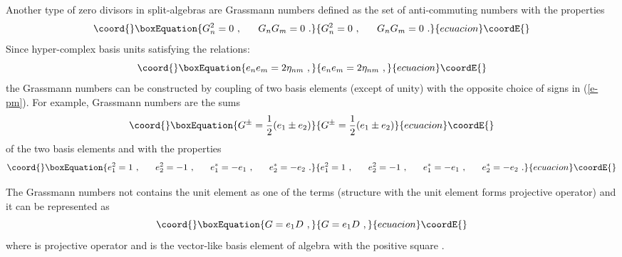 \documentclass[a4paper,12pt]{article}
\begin{document}
Another type of zero divisors in split-algebras are Grassmann numbers defined as the set of 
anti-commuting numbers \coordHE{} with the properties 
\begin{equation}\coord{}\boxEquation{ \label{G}
G^2_n = 0~, ~~~~~{G_n G_m} = 0~. 
}{ G^2_n = 0~, ~~~~~{G_n G_m} = 0~. 
}{ecuacion}\coordE{}\end{equation}
Since hyper-complex basis units satisfying the relations:
\begin{equation}\coord{}\boxEquation{ \label{ee=eta}
e_n e_m = 2\eta_{nm}~, 
}{ e_n e_m = 2\eta_{nm}~, 
}{ecuacion}\coordE{}\end{equation}
the Grassmann numbers can be constructed by coupling of two basis elements (except of unity) 
with the opposite choice of signs in (\ref{e-pm}). For example, Grassmann numbers are the 
sums 
\begin{equation}\coord{}\boxEquation{ \label{G-pm}
G^\pm = \frac{1}{2}(e_1 \pm e_2)
}{ G^\pm = \frac{1}{2}(e_1 \pm e_2)
}{ecuacion}\coordE{}\end{equation}
of the two basis elements \coordHE{} and \coordHE{} with the properties
\begin{equation}\coord{}\boxEquation{ \label{e12}
e_1^2 = 1 ~, ~~~~~ e_2^2 = -1 ~, ~~~~~ e_1^* = - e_1 ~, ~~~~~ e_2^* = - e_2~.
}{ e_1^2 = 1 ~, ~~~~~ e_2^2 = -1 ~, ~~~~~ e_1^* = - e_1 ~, ~~~~~ e_2^* = - e_2~.
}{ecuacion}\coordE{}\end{equation}

The Grassmann numbers not contains the unit element \coordHE{} as one of the terms (structure with 
the unit element forms projective operator) and it can be represented as
\begin{equation}\coord{}\boxEquation{ \label{G=D}
G = e_1 D ~,
}{ G = e_1 D ~,
}{ecuacion}\coordE{}\end{equation}
where \coordHE{} is projective operator and \coordHE{} is the vector-like basis element of algebra with 
the positive square \coordHE{}. 
\end{document}
